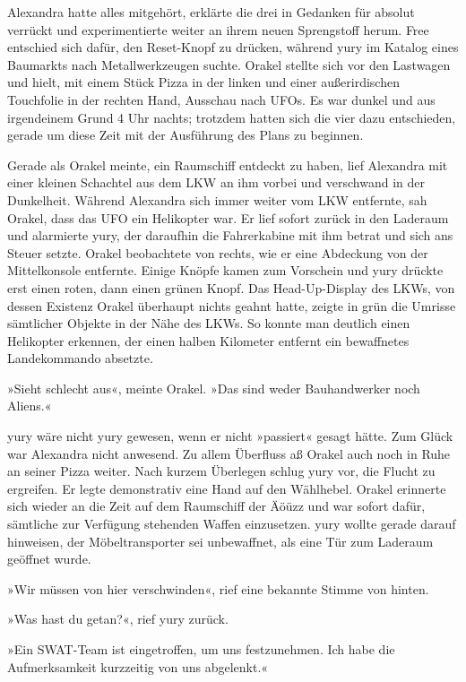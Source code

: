 Alexandra hatte alles mitgehört, erklärte die drei in Gedanken für absolut verrückt und experimentierte weiter an ihrem neuen Sprengstoff herum. Free entschied sich dafür, den Reset-Knopf zu drücken, während yury im Katalog eines Baumarkts nach Metallwerkzeugen suchte. Orakel stellte sich vor den Lastwagen und hielt, mit einem Stück Pizza in der linken und einer außerirdischen Touchfolie in der rechten Hand, Ausschau nach UFOs. Es war dunkel und aus irgendeinem Grund 4 Uhr nachts; trotzdem hatten sich die vier dazu entschieden, gerade um diese Zeit mit der Ausführung des Plans zu beginnen.

Gerade als Orakel meinte, ein Raumschiff entdeckt zu haben, lief Alexandra mit einer kleinen Schachtel aus dem LKW an ihm vorbei und verschwand in der Dunkelheit. Während Alexandra sich immer weiter vom LKW entfernte, sah Orakel, dass das UFO ein Helikopter war. Er lief sofort zurück in den Laderaum und alarmierte yury, der daraufhin die Fahrerkabine mit ihm betrat und sich ans Steuer setzte. Orakel beobachtete von rechts, wie er eine Abdeckung von der Mittelkonsole entfernte. Einige Knöpfe kamen zum Vorschein und yury drückte erst einen roten, dann einen grünen Knopf. Das Head-Up-Display des LKWs, von dessen Existenz Orakel überhaupt nichts geahnt hatte, zeigte in grün die Umrisse sämtlicher Objekte in der Nähe des LKWs. So konnte man deutlich einen Helikopter erkennen, der einen halben Kilometer entfernt ein bewaffnetes Landekommando absetzte.

»Sieht schlecht aus«, meinte Orakel. »Das sind weder Bauhandwerker noch Aliens.«

yury wäre nicht yury gewesen, wenn er nicht »passiert« gesagt hätte. Zum Glück war Alexandra nicht anwesend. Zu allem Überfluss aß Orakel auch noch in Ruhe an seiner Pizza weiter. Nach kurzem Überlegen schlug yury vor, die Flucht zu ergreifen. Er legte demonstrativ eine Hand auf den Wählhebel. Orakel erinnerte sich wieder an die Zeit auf dem Raumschiff der Äöüzz und war sofort dafür, sämtliche zur Verfügung stehenden Waffen einzusetzen. yury wollte gerade darauf hinweisen, der Möbeltransporter sei unbewaffnet, als eine Tür zum Laderaum geöffnet wurde.

»Wir müssen von hier verschwinden«, rief eine bekannte Stimme von hinten.

»Was hast du getan?«, rief yury zurück.

»Ein SWAT-Team ist eingetroffen, um uns festzunehmen. Ich habe die Aufmerksamkeit kurzzeitig von uns abgelenkt.«

